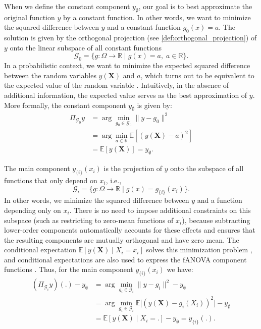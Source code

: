 When we define the constant component $y_\emptyset$, our goal is to best 
approximate the original function $y$ by a constant function. 
In other words, we want to minimize the squared difference between $y$ and 
a constant function $g_0(x) = a$. 
The solution is given by the orthogonal projection (see \autoref{def:orthogonal_projection}) 
of $y$ onto the linear subspace of all constant functions 
$$\mathcal{G}_0 = \{ g : \Omega \to \mathbb{R} \mid g(x) = a,\; a \in \mathbb{R} \}.$$
In a probabilistic context, we want to minimize the expected squared difference 
between the random variables $y(\boldsymbol{X})$ and $a$, which turns out to be 
equivalent to the expected value of the random variable \citep{Vaart_1998}.
Intuitively, in the absence of additional information, the expected value serves 
as the best approximation of $y$. 
More formally, the constant component $y_{\emptyset}$ is given by:
\begin{align*}
    \Pi_{\mathcal{G}_0}y
    &= \arg \min_{g_0 \in \mathcal{G}_0} \|y - g_0\|^2 \\ 
    &= \arg \min_{a \in \mathbb{R}} \mathbb{E}[(y(\boldsymbol{X}) - a)^2] \\ 
    &= \mathbb{E}[y(\boldsymbol{X})] = y_{\emptyset}.
\end{align*}

The main component $y_{\{i\}}(x_i)$ is the projection of $y$ onto the subspace of all 
functions that only depend on $x_i$, i.e.,
\[
\mathcal{G}_i = \{ g : \Omega \to \mathbb{R} \mid g(x) = g_{\{i\}}(x_i) \}.
\]
In other words, we minimize the squared difference between $y$ and a function depending 
only on $x_i$. There is no need to impose additional constraints on this subspace 
(such as restricting to zero-mean functions of $x_i$), because subtracting lower-order 
components automatically accounts for these effects and ensures that the resulting 
components are mutually orthogonal and have zero mean.
The conditional expectation $\mathbb{E}[y(\boldsymbol{X}) \mid X_i = x_i]$ solves this 
minimization problem \citep{Vaart_1998}, and conditional expectations are also used to 
express the fANOVA component functions \citep{muehlenstaedt2012}. 
Thus, for the main component $y_{\{i\}}(x_i)$ we have:
\begin{align*}
    (\Pi_{\mathcal{G}_i}y)(.) - y_{\emptyset}
    &= \arg \min_{g_i \in \mathcal{G}_i} \|y - g_i\|^2 - y_{\emptyset} \\ 
    &= \arg \min_{g_i \in \mathcal{G}_i} 
       \mathbb{E}\!\big[(y(\boldsymbol{X}) - g_i(X_i))^2\big] - y_{\emptyset} \\ 
    &= \mathbb{E}[y(\boldsymbol{X}) \mid X_i = .] - y_{\emptyset} 
       = y_{\{i\}}(.).
\end{align*}


